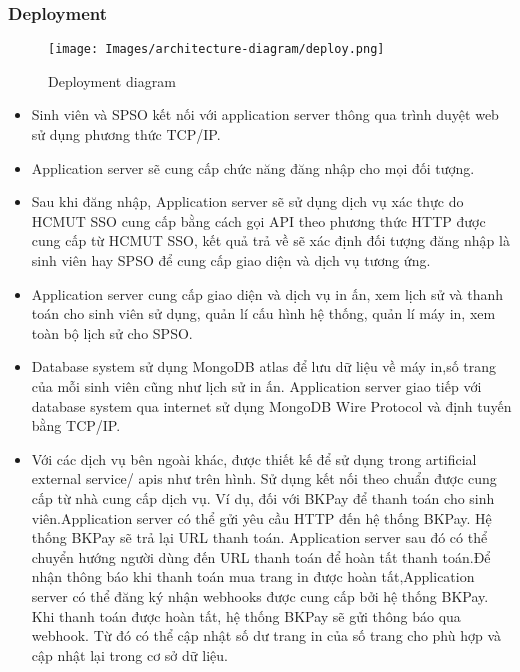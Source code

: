 \subsubsection{Deployment}
\begin{figure}[H]
    \centering
\texttt{[image: Images/architecture-diagram/deploy.png]}
    \vspace{0.1cm}
    \caption{Deployment diagram }
\end{figure}
\begin{itemize}
\item Sinh viên và SPSO kết nối với application server thông qua trình duyệt web sử dụng phương thức TCP/IP. \par
\item Application server sẽ cung cấp chức năng đăng nhập cho mọi đối tượng.  \par
\item Sau khi đăng nhập, Application server sẽ sử dụng dịch vụ xác thực do HCMUT SSO cung cấp bằng cách gọi API theo phương thức HTTP được cung cấp từ HCMUT SSO, kết quả trả về sẽ xác định đối tượng đăng nhập là  sinh viên hay SPSO để cung cấp giao diện và dịch vụ tương ứng.\par    


\item Application server cung cấp giao diện và dịch vụ in ấn, xem lịch sử và thanh toán cho sinh viên sử dụng, quản lí cấu hình hệ thống, quản lí máy in, xem toàn bộ lịch sử cho SPSO. \par   


\item Database system sử dụng MongoDB atlas để lưu dữ liệu về máy in,số trang của mỗi sinh viên cũng như lịch sử in ấn. Application server giao tiếp với database system qua internet sử dụng MongoDB Wire Protocol và định tuyến bằng TCP/IP.  \par
\item Với các dịch vụ bên ngoài khác, được thiết kế để sử dụng trong artificial external service/ apis như trên hình. Sử dụng kết nối theo chuẩn được cung cấp từ nhà cung cấp dịch vụ. Ví dụ, đối với BKPay để thanh toán cho sinh viên.Application server có thể gửi yêu cầu HTTP đến hệ thống BKPay. Hệ thống BKPay sẽ trả lại URL thanh toán. Application server sau đó có thể chuyển hướng người dùng đến URL thanh toán để hoàn tất thanh toán.Để nhận thông báo khi thanh toán mua trang in được hoàn tất,Application server có thể đăng ký nhận webhooks được cung cấp bởi hệ thống BKPay. Khi thanh toán được hoàn tất, hệ thống BKPay sẽ gửi thông báo qua webhook. Từ đó có thể cập nhật số dư trang in của số trang cho phù hợp và cập nhật lại trong cơ sở dữ liệu.\par

\end{itemize}




